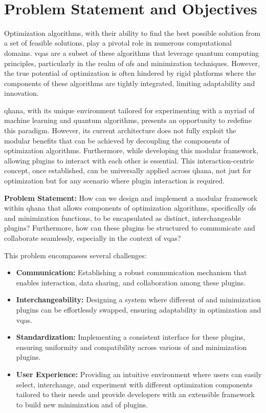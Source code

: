 \documentclass[
  a4paper,  %
  twoside,  %
  bibliography=totoc,
  headsepline,
  cleardoublepage=empty,
  parskip=half,
  draft=false
]{scrbook}
\begin{document}
\
\chapter{Problem Statement and Objectives}
\label{chap:problem}

Optimization algorithms, with their ability to find the best possible solution from a set of feasible solutions, play a pivotal role in numerous computational domains.
\glspl{vqa} are a subset of these algorithms that leverage quantum computing principles, particularly in the realm of \glspl{of} and minimization techniques.
However, the true potential of optimization is often hindered by rigid platforms where the components of these algorithms are tightly integrated, limiting adaptability and innovation.

\gls{qhana}, with its unique environment tailored for experimenting with a myriad of machine learning and quantum algorithms, presents an opportunity to redefine this paradigm.
However, its current architecture does not fully exploit the modular benefits that can be achieved by decoupling the components of optimization algorithms.
Furthermore, while developing this modular framework, allowing plugins to interact with each other is essential.
This interaction-centric concept, once established, can be universally applied across \gls{qhana}, not just for optimization but for any scenario where plugin interaction is required.

\textbf{Problem Statement:}
How can we design and implement a modular framework within \gls{qhana} that allows components of optimization algorithms, specifically \glspl{of} and minimization functions, to be encapsulated as distinct, interchangeable plugins?
Furthermore, how can these plugins be structured to communicate and collaborate seamlessly, especially in the context of \glspl{vqa}?

This problem encompasses several challenges:

\begin{itemize}
    \item \textbf{Communication:} Establishing a robust communication mechanism that enables interaction, data sharing, and collaboration among these plugins.
    \item \textbf{Interchangeability:} Designing a system where different \gls{of} and minimization plugins can be effortlessly swapped, ensuring adaptability in optimization and \glspl{vqa}.
    \item \textbf{Standardization:} Implementing a consistent interface for these plugins, ensuring uniformity and compatibility across various \gls{of} and minimization plugins.
    \item \textbf{User Experience:} Providing an intuitive environment where users can easily select, interchange, and experiment with different optimization components tailored to their needs and provide developers with an extensible framework to build new minimization and \gls{of} plugins.
\end{itemize}
\end{document}
